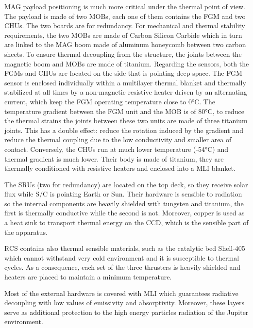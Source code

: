 \begin{itemize}
    MAG payload positioning is much more critical under the thermal point of view. The payload is made of two MOBs, each one of them contains the FGM and two CHUs. The two boards are for redundancy. 
    For mechanical and thermal stability requirements, the two MOBs are made of Carbon Silicon Carbide which in turn are linked to the MAG boom made of aluminum honeycomb between two carbon sheets. To ensure thermal decoupling from the structure, the joints between the magnetic boom and MOBs are made of titanium. 
    Regarding the sensors, both the FGMs and CHUs are located on the side that is pointing deep space.
    The FGM sensor is enclosed individually within a multilayer thermal blanket and thermally stabilized at all times by a non-magnetic resistive heater driven by an alternating current, which keep the FGM operating temperature close to 0°C. The temperature gradient between the FGM unit and the MOB is of 80°C, to reduce the thermal strains the joints between these two units are made of three titanium joints.  This has a double effect: reduce the rotation induced by the gradient and reduce the thermal coupling due to the low conductivity and smaller area of contact.
    Conversely, the CHUs run at much lower temperature (-54°C) and thermal gradient is much lower. Their body is made of titanium, they are thermally conditioned with resistive heaters and enclosed into a MLI blanket.  

    The SRUs (two for redundancy) are located on the top deck, so they receive solar flux while S/C is pointing Earth or Sun. Their hardware is sensible to radiation so the internal components are heavily shielded with tungsten and titanium, the first is thermally conductive while the second is not. 
    Moreover, copper is used as a heat sink to transport thermal energy on the CCD, which is the sensible part of the apparatus.\cite{MAG_info}

    RCS contains also thermal sensible materials, such as the catalytic bed Shell-405 which cannot withstand very cold environment and it is susceptible to thermal cycles. As a consequence, each set of the three thrusters is heavily shielded and heaters are placed to maintain a minimum temperature. \cite{Leros}

    Most of the external hardware is covered with MLI which guarantees radiative decoupling with low values of emissivity and absorptivity. Moreover, these layers serve as additional protection to the high energy particles radiation of the Jupiter environment.


\end{itemize}
